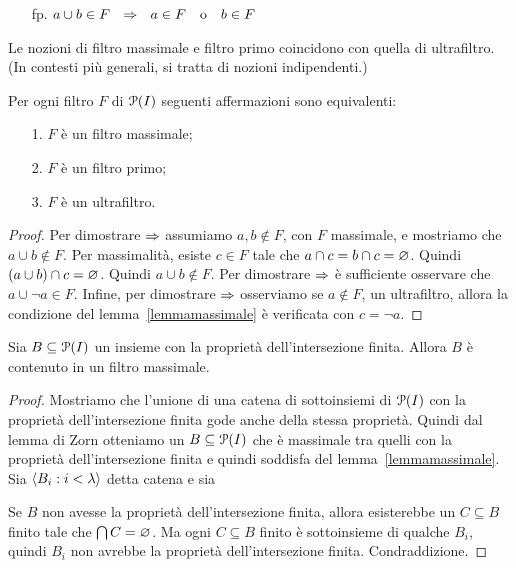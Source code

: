 \begin{itemize}
\item[fp.] $a\cup b\in F\ \ \IMP\ \ a\in F\ \ \textrm{ o }\ \ b\in F$
\end{itemize}

Le nozioni di filtro massimale e filtro primo coincidono con quella di ultrafiltro. (In contesti pi\`u generali, si tratta di nozioni indipendenti.)

\begin{proposition}
Per ogni filtro $F$ di $\P(I)$ seguenti affermazioni sono equivalenti:
\begin{itemize}
\item[1.] $F$ \`e un filtro massimale;
\item[2.] $F$ \`e un filtro primo;
\item[3.] $F$ \`e un ultrafiltro.
\end{itemize}
\end{proposition}
\begin{proof}
Per dimostrare $\IMP$ assumiamo $a,b\notin F$, con $F$ massimale, e mostriamo che $a\cup b\notin F$. Per massimalit\`a, esiste $c\in F$ tale che $a\cap c= b\cap c= \0$. Quindi $(a\cup b)\cap c= \0$. Quindi  $a\cup b\notin F$. Per dimostrare $\IMP$ \`e sufficiente osservare che $a\cup \neg a\in F$. Infine, per dimostrare $\IMP$ osserviamo se $a\notin F$, un ultrafiltro, allora la condizione  del lemma~\ref{lemmamassimale} \`e verificata con $c=\neg a$. 
\end{proof}

\begin{proposition}\label{esistenzamassimale1}
Sia $B\subseteq\P(I)$ un insieme con la propriet\`a dell'intersezione finita. Allora $B$ \`e contenuto in un filtro massimale.
\end{proposition}

\begin{proof}
Mostriamo che l'unione di una catena di sottoinsiemi di $\P(I)$ con la propriet\`a dell'intersezione finita gode anche della stessa propriet\`a. Quindi dal lemma di Zorn otteniamo un $B\subseteq\P(I)$ che \`e massimale tra quelli con la propriet\`a dell'intersezione finita e quindi soddisfa  del lemma~\ref{lemmamassimale}. Sia $\<B_i:i<\lambda\>$ detta catena e sia


Se $B$ non avesse la propriet\`a dell'intersezione finita, allora esisterebbe un $C\subseteq B$ finito tale che $\bigcap  C=\0$. Ma ogni $C\subseteq B$ finito \`e sottoinsieme di qualche $B_i$, quindi $B_i$ non avrebbe la propriet\`a dell'intersezione finita. Condraddizione.
\end{proof}

